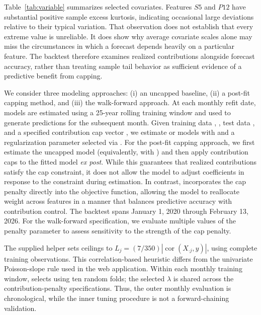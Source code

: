 \documentclass[article,shortnames,nofooter]{jss}
\begin{document}
\begin{table}[ht]
\centering

\caption{Summary statistics of selected variables from the Kaggle dataset. Features $S5$ and $P12$ exhibit substantial positive kurtosis.}
\label{tab:variable}
\end{table}

Table~\ref{tab:variable} summarizes selected covariates. Features $S5$ and $P12$ have substantial positive sample excess kurtosis, indicating occasional large deviations relative to their typical variation. That observation does not establish that every extreme value is unreliable. It does show why average covariate scales alone may miss the circumstances in which a forecast depends heavily on a particular feature. The backtest therefore examines realized contributions alongside forecast accuracy, rather than treating sample tail behavior as sufficient evidence of a predictive benefit from capping.

We consider three modeling approaches: (i) an uncapped baseline, (ii) a post-fit capping method, and (iii) the walk-forward  approach. At each monthly refit date, models are estimated using a 25-year rolling training window and used to generate predictions for the subsequent month. Given training data , , test data , and a specified contribution cap vector , we estimate  or  models with  and a regularization parameter  selected via . For the post-fit capping approach, we first estimate the uncapped model (equivalently,  with ) and then apply contribution caps to the fitted model \textit{ex post}. While this guarantees that realized contributions satisfy the cap constraint, it does not allow the model to adjust coefficients in response to the constraint during estimation. In contrast,  incorporates the cap penalty directly into the objective function, allowing the model to reallocate weight across features in a manner that balances predictive accuracy with contribution control. The backtest spans January 1, 2020 through February 13, 2026. For the walk-forward specification, we evaluate multiple values of the penalty parameter  to assess sensitivity to the strength of the cap penalty.

The supplied helper sets ceilings to $L_j=(7/350)|\operatorname{cor}(X_{\cdot j},y)|$, using complete training observations. This correlation-based heuristic differs from the univariate Poisson-slope rule used in the web application. Within each monthly training window,  selects  using ten random folds; the selected $\lambda$ is shared across the contribution-penalty specifications. Thus, the outer monthly evaluation is chronological, while the inner tuning procedure is not a forward-chaining validation.
\end{document}
